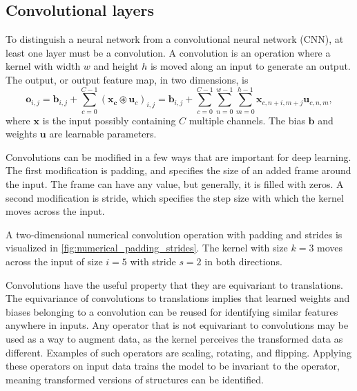 \subsection{Convolutional layers}
To distinguish a neural network from a convolutional neural network (CNN), at least one layer must be a convolution.
A convolution is an operation where a kernel with width $w$ and height $h$ is moved along an input to generate an output.
The output, or output feature map, in two dimensions, is
\begin{equation}
    \mathbf{o}_{i,j} = \mathbf{b}_{i,j} + \sum_{c=0}^{C-1}(\mathbf{x_c} \circledast \mathbf{u}_c)_{i,j}
    = \mathbf{b}_{i,j} + \sum_{c=0}^{C-1}\sum_{n=0}^{w-1}\sum_{m=0}^{h-1}\mathbf{x}_{c,n+i,m+j}\mathbf{u}_{c,n,m},
\end{equation}
where $\mathbf{x}$ is the input possibly containing $C$ multiple channels.
The bias $\mathbf{b}$ and weights $\mathbf{u}$ are learnable parameters.

Convolutions can be modified in a few ways that are important for deep learning.
The first modification is padding, and specifies the size of an added frame around the input.
The frame can have any value, but generally, it is filled with zeros.
A second modification is stride, which specifies the step size with which the kernel moves across the input.

A two-dimensional numerical convolution operation with padding and strides is visualized in \cref{fig:numerical_padding_strides}.
The kernel with size $k=3$ moves across the input of size $i=5$ with stride $s = 2$ in both directions.

Convolutions have the useful property that they are equivariant to translations.
The equivariance of convolutions to translations implies that learned weights and biases belonging to a convolution can be reused for identifying similar features anywhere in inputs.
Any operator that is not equivariant to convolutions may be used as a way to augment data, as the kernel perceives the transformed data as different.
Examples of such operators are scaling, rotating, and flipping.
Applying these operators on input data trains the model to be invariant to the operator, meaning transformed versions of structures can be identified.

